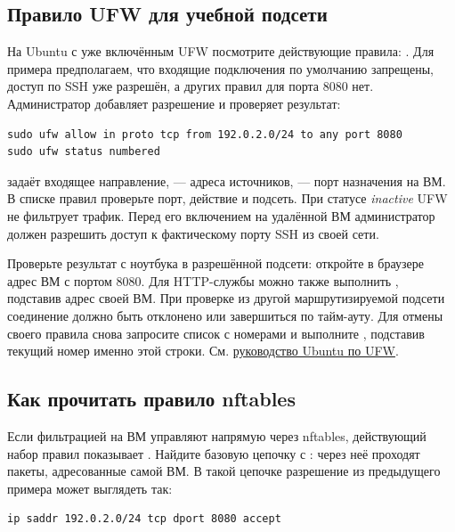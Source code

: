 \subsection{Правило UFW для учебной подсети}

На Ubuntu с уже включённым UFW посмотрите действующие правила:
. Для примера предполагаем, что входящие
подключения по умолчанию запрещены, доступ по SSH уже разрешён,
а других правил для порта 8080 нет. Администратор добавляет разрешение
и проверяет результат:

\begin{verbatim}
sudo ufw allow in proto tcp from 192.0.2.0/24 to any port 8080
sudo ufw status numbered
\end{verbatim}

 задаёт входящее направление,  --- адреса источников,
 --- порт назначения на ВМ. В списке правил
проверьте порт, действие  и подсеть. При статусе
\emph{inactive} UFW не фильтрует трафик. Перед его включением на
удалённой ВМ администратор должен разрешить доступ к фактическому
порту SSH из своей сети.

Проверьте результат с ноутбука в разрешённой подсети: откройте в
браузере адрес ВМ с портом 8080. Для HTTP-службы можно также выполнить
, подставив адрес своей ВМ.
При проверке из другой маршрутизируемой подсети соединение должно
быть отклонено или завершиться по тайм-ауту. Для отмены своего правила
снова запросите список с номерами и выполните ,
подставив текущий номер именно этой строки.
См. \href{https://ubuntu.com/server/docs/how-to/security/firewalls/}{руководство Ubuntu по UFW}.

\subsection{Как прочитать правило nftables}

Если фильтрацией на ВМ управляют напрямую через nftables, действующий
набор правил показывает . Найдите базовую
цепочку с : через неё проходят пакеты, адресованные самой
ВМ. В такой цепочке разрешение из предыдущего примера может выглядеть так:

\begin{verbatim}
ip saddr 192.0.2.0/24 tcp dport 8080 accept
\end{verbatim}

